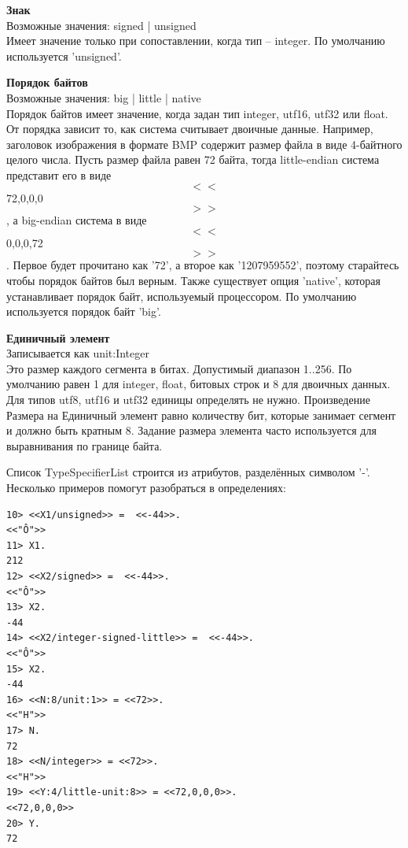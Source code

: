 \documentclass[a4paper,12pt]{report}
\newcommand{\ops}{\colorbox{lgreen}}
\begin{document}
\begin{minipage}{\textwidth}
    \textbf{Знак}\\ 
    Возможные значения: \ops{signed | unsigned}\\ 
    Имеет значение только при сопоставлении, когда тип \--- integer. По умолчанию используется 'unsigned'.\\ 
\end{minipage}

\begin{minipage}{\textwidth}
    \textbf{Порядок байтов}\\ 
    Возможные значения: \ops{big | little | native}\\ 
    Порядок байтов имеет значение, когда задан тип integer, utf16, utf32 или float. От порядка зависит то, как система считывает двоичные данные. Например, заголовок изображения в формате BMP содержит размер файла в виде 4\--байтного целого числа. Пусть размер файла равен 72 байта, тогда little\--endian система представит его в виде \ops{$$<<$$72,0,0,0$$>>$$}, а big\--endian система в виде \ops{$$<<$$0,0,0,72$$>>$$}. Первое будет прочитано как '72', а второе как '1207959552', поэтому старайтесь чтобы порядок байтов был верным. Также существует опция 'native', которая устанавливает порядок байт, используемый процессором. По умолчанию используется порядок байт 'big'.\\ 
\end{minipage}

\begin{minipage}{\textwidth}
    \textbf{Единичный элемент}\\ 
    Записывается как \ops{unit:Integer}\\ 
    Это размер каждого сегмента в битах. Допустимый диапазон 1..256. По умолчанию равен 1 для integer, float, битовых строк и 8 для двоичных данных. Для типов utf8, utf16 и utf32 единицы определять не нужно. Произведение Размера на Единичный элемент равно количеству бит, которые занимает сегмент и должно быть кратным 8. Задание размера элемента часто используется для выравнивания по границе байта.\\  
\end{minipage}

Список TypeSpecifierList строится из атрибутов, разделённых символом '\--'.\\ 

Несколько примеров помогут разобраться в определениях:
\begin{lstlisting}[style=repl]
10> <<X1/unsigned>> =  <<-44>>.
<<"Ô">>
11> X1.
212
12> <<X2/signed>> =  <<-44>>. 
<<"Ô">>
13> X2.
-44
14> <<X2/integer-signed-little>> =  <<-44>>.
<<"Ô">>
15> X2.
-44
16> <<N:8/unit:1>> = <<72>>.
<<"H">>
17> N.
72
18> <<N/integer>> = <<72>>.
<<"H">>
19> <<Y:4/little-unit:8>> = <<72,0,0,0>>.     
<<72,0,0,0>>
20> Y.
72
\end{lstlisting}
\end{document}
